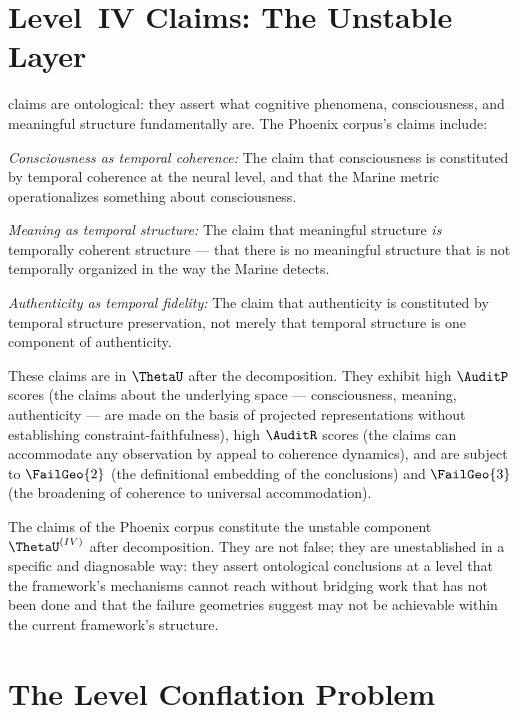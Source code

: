 \section{Level~IV Claims: The Unstable Layer}
\label{sec:level4-claims}

\LevelIV{} claims are ontological: they assert what
cognitive phenomena, consciousness, and meaningful structure
fundamentally are. The Phoenix corpus's \LevelIV{} claims
include:

\textit{Consciousness as temporal coherence:} The claim
that consciousness is constituted by temporal coherence
at the neural level, and that the Marine metric operationalizes
something about consciousness.

\textit{Meaning as temporal structure:} The claim that
meaningful structure \textit{is} temporally coherent
structure --- that there is no meaningful structure
that is not temporally organized in the way the Marine
detects.

\textit{Authenticity as temporal fidelity:} The claim
that authenticity is constituted by temporal structure
preservation, not merely that temporal structure is
one component of authenticity.

These claims are in $\ThetaU$ after the decomposition.
They exhibit high $\AuditP$ scores (the claims about the
underlying space --- consciousness, meaning, authenticity
--- are made on the basis of projected representations
without establishing constraint-faithfulness), high
$\AuditR$ scores (the claims can accommodate any
observation by appeal to coherence dynamics), and
are subject to $\FailGeo{2}$ (the definitional embedding
of the conclusions) and $\FailGeo{3}$ (the broadening
of coherence to universal accommodation).

\begin{auditprop}
\label{ap:level4-unstable}
The \LevelIV{} claims of the Phoenix corpus constitute
the unstable component $\ThetaU^{(IV)}$ after decomposition.
They are not false; they are unestablished in a
specific and diagnosable way: they assert ontological
conclusions at a level that the framework's mechanisms
cannot reach without bridging work that has not been
done and that the failure geometries suggest may not
be achievable within the current framework's structure.
\end{auditprop}

\section{The Level Conflation Problem}
\label{sec:level-conflation}

